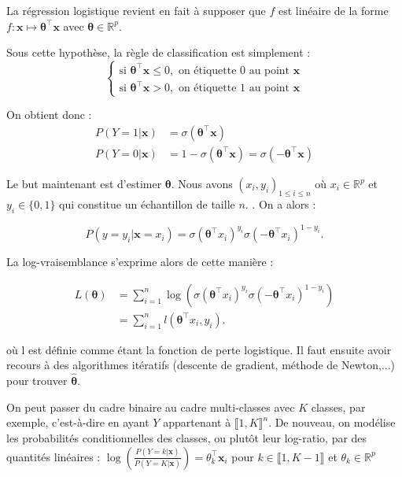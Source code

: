 \documentclass{article}
\begin{document}
La régression logistique revient en fait à supposer que \( f \) est linéaire de la forme \( f : \bm{x} \mapsto \bm{\theta}^\top \bm{x} \) avec \( \bm{\theta} \in \mathbb{R}^p \).


Sous cette hypothèse, la règle de classification est simplement :
\[
\begin{cases}
\text{si } \bm{\theta}^\top \bm{x}\leq 0 , \text{ on étiquette 0 au point } \bm{x} \\
\text{si } \bm{\theta}^\top \bm{x} > 0, \text{ on étiquette 1 au point } \bm{x}
\end{cases}
\]

On obtient donc :
\begin{align*}
    P(Y=1|\bm{x}) &= \sigma(\bm{\theta}^\top \bm{x}) \\
    P(Y=0|\bm{x}) &= 1- \sigma(\bm{\theta}^\top \bm{x}) = \sigma(-\bm{\theta}^\top \bm{x})
\end{align*}

Le but maintenant est d'estimer $\bm{\theta}$. Nous avons $(x_i, y_i)_{1 \leq i \leq n}$  où \(x_i \in \mathbb{R}^p\) et \(y_i \in \{0,1\}\) qui constitue un échantillon de taille \(n\).
. On a alors :

\[ P(y = y_i | \bm{x} = x_i) = \sigma(\bm{\theta}^\top x_i)^{y_i} \sigma(-\bm{\theta}^\top x_i)^{1-y_i}. \]

La log-vraisemblance s'exprime alors de cette manière :

\begin{align*}
    L(\bm{\theta}) &= \sum_{i=1}^{n} \log\left( \sigma(\bm{\theta}^\top x_i)^{y_i} \sigma(-\bm{\theta}^\top x_i)^{1-y_i} \right) \\
                   &= \sum_{i=1}^{n} l(\bm{\theta}^\top x_i, y_i).
\end{align*}

où l est définie comme étant la fonction de perte logistique. Il faut ensuite  avoir recours à des algorithmes itératifs (descente de gradient, méthode de Newton,...) pour trouver  $\bm{\hat{\theta}}$.

On peut passer du cadre binaire au cadre multi-classes avec \(K\) classes, par exemple, c'est-à-dire en ayant \(Y\) appartenant à \(\llbracket 1, K \rrbracket^{n}\). De nouveau, on modélise les probabilités conditionnelles des classes, ou plutôt leur log-ratio, par des quantités linéaires :
$\log\left(\frac{P(Y=k|\bm{x})}{P(Y=K|\bm{x})}\right) = \theta_k^\top \bm{x}_i
$ pour \(k \in \llbracket 1, K-1 \rrbracket\) et $\theta_{k} \in \mathbb{R}^p$
\end{document}

